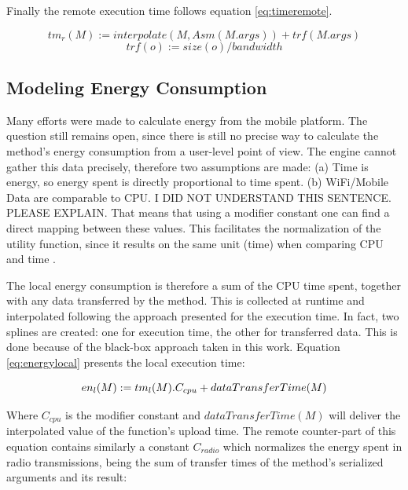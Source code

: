 \documentclass[10pt, conference, letterpaper]{IEEEtran}
\begin{document}
  Finally the remote execution time follows equation \ref{eq:timeremote}.

  \begin{equation} \label{eq:timeremote}
    tm_{r}(M) := interpolate(M, Asm(M.args)) + trf(M.args)
  \end{equation}
  \begin{equation}
    trf(o) := size(o) / bandwidth
  \end{equation}

\subsection{Modeling Energy Consumption} 
\label{sec:energy}

  Many efforts were made to calculate energy from the mobile platform. The question still remains open, since there is still no precise way to calculate the method's energy consumption from a user-level point of view. The engine cannot gather this data precisely, therefore two assumptions are made: (a) Time is energy, so energy spent is directly proportional to time spent. {\color{red} (b) WiFi/Mobile Data are comparable to CPU. I DID NOT UNDERSTAND THIS SENTENCE. PLEASE EXPLAIN.}  That means that using a modifier constant one can find a direct mapping between these values. This facilitates the normalization of the utility function, since it results on the same unit (time) when comparing CPU and time \cite{6606420}.

  The local energy consumption is therefore a sum of the CPU time spent, together with any data transferred by the method. This is  collected at runtime and interpolated following the approach presented for the execution time. In fact, two splines are created: one for execution time, the other for transferred data. This is done because of the black-box approach taken in this work. Equation \ref{eq:energylocal} presents the local execution time:

  \begin{equation} \label{eq:energylocal}
    en_{l}(M) := \\ tm_{l}(M) . C_{cpu} + dataTransferTime(M)
  \end{equation}

  Where $C_{cpu}$ is the modifier constant and $dataTransferTime(M)$ will deliver the interpolated value of the function's upload time. The remote counter-part of this equation contains similarly a constant $C_{radio}$ which normalizes the energy spent in radio transmissions, being the sum of transfer times of the method's serialized arguments and its result:
\end{document}
